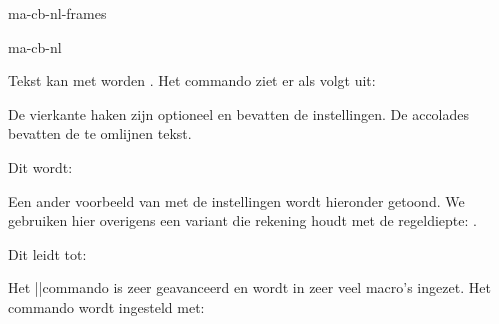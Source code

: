 \startonderdeel ma-cb-nl-frames

\produkt ma-cb-nl




Tekst kan met \type{\omlijnd} worden . Het
commando ziet er als volgt uit:


De vierkante haken zijn optioneel en bevatten de
instellingen. De accolades bevatten de te omlijnen tekst.

\startbuffer
{}
\stopbuffer

\typebuffer

Dit wordt:

\startregelcorrectie
\haalbuffer
\stopregelcorrectie

Een ander voorbeeld van \type{\omlijnd} met de instellingen
wordt hieronder getoond. We gebruiken hier overigens een
variant die rekening houdt met de regeldiepte:
\type{\inlijnd}.

\startbuffer
\regellinks
  {}
\regelmidden
  {}
\regelrechts
  {}
\stopbuffer

\typebuffer

Dit leidt tot:

\startregelcorrectie
\haalbuffer
\stopregelcorrectie

Het \type{\omlijnd}||commando is zeer geavanceerd en wordt
in zeer veel macro's ingezet. Het commando wordt ingesteld
met:


\stoponderdeel
